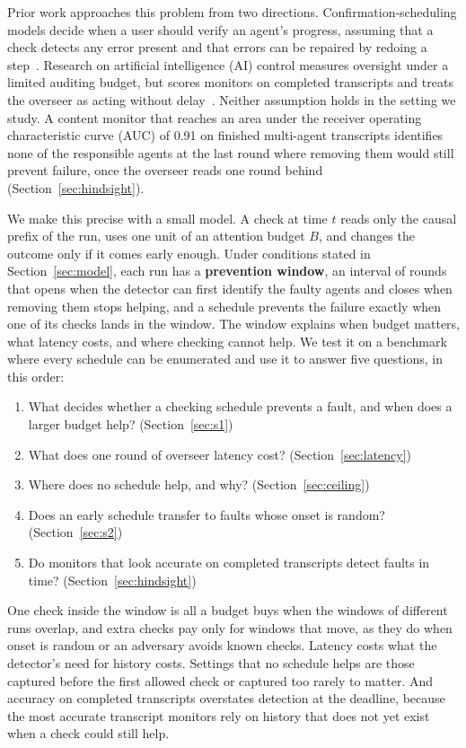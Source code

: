 \documentclass[pdflatex,sn-mathphys-num]{sn-jnl}
\theoremstyle{thmstyleone}%
\begin{document}
Prior work approaches this problem from two directions. Confirmation-scheduling models decide when a user should verify an agent's progress, assuming that a check detects any error present and that errors can be repaired by redoing a step~\cite{zhou2026whenshouldcheck}. Research on artificial intelligence (AI) control measures oversight under a limited auditing budget, but scores monitors on completed transcripts and treats the overseer as acting without delay~\cite{greenblatt2024aicontrol}. Neither assumption holds in the setting we study. A content monitor that reaches an area under the receiver operating characteristic curve (AUC) of 0.91 on finished multi-agent transcripts identifies none of the responsible agents at the last round where removing them would still prevent failure, once the overseer reads one round behind (Section~\ref{sec:hindsight}).

We make this precise with a small model. A check at time $t$ reads only the causal prefix of the run, uses one unit of an attention budget $B$, and changes the outcome only if it comes early enough. Under conditions stated in Section~\ref{sec:model}, each run has a \textbf{prevention window}, an interval of rounds that opens when the detector can first identify the faulty agents and closes when removing them stops helping, and a schedule prevents the failure exactly when one of its checks lands in the window. The window explains when budget matters, what latency costs, and where checking cannot help. We test it on a benchmark where every schedule can be enumerated and use it to answer five questions, in this order:

\begin{enumerate}
  \item What decides whether a checking schedule prevents a fault, and when does a larger budget help? (Section~\ref{sec:s1})
  \item What does one round of overseer latency cost? (Section~\ref{sec:latency})
  \item Where does no schedule help, and why? (Section~\ref{sec:ceiling})
  \item Does an early schedule transfer to faults whose onset is random? (Section~\ref{sec:s2})
  \item Do monitors that look accurate on completed transcripts detect faults in time? (Section~\ref{sec:hindsight})
\end{enumerate}

One check inside the window is all a budget buys when the windows of different runs overlap, and extra checks pay only for windows that move, as they do when onset is random or an adversary avoids known checks. Latency costs what the detector's need for history costs. Settings that no schedule helps are those captured before the first allowed check or captured too rarely to matter. And accuracy on completed transcripts overstates detection at the deadline, because the most accurate transcript monitors rely on history that does not yet exist when a check could still help.
\end{document}

